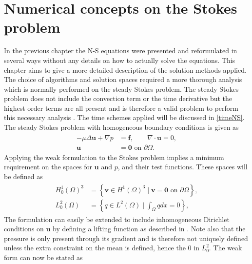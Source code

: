 


\section{Numerical concepts on the Stokes problem} \label{stokes}
In the previous chapter the N-S equations were presented and reformulated in several ways without any details on how to
actually solve the equations. This chapter aims to give a more detailed description of the solution methods applied.
The choice of algorithms and solution spaces required a more thorough analysis which is normally performed on the 
steady Stokes problem. The steady Stokes problem does not include the convection term or the time derivative 
but the highest order terms are all present and is therefore a valid problem to perform this necessary
analysis \cite{Karniadakis}. The time schemes applied will be discussed in \cref{timeNS}.
The steady Stokes problem with homogeneous boundary conditions is given as 
%
\begin{align}
    \begin{split}
        - \mu \Delta \mathbf{u} + \nabla p &= \mathbf{f}, \qquad \nabla \cdot \mathbf{u} = 0, \\
        \mathbf{u} &= \mathbf{0} \text{  on  } \partial \Omega.
    \end{split}
    \label{eq:stokes}
\end{align}
%
Applying the weak formulation to the Stokes problem implies a minimum requirement on the spaces for $\mathbf{u}$ and $p$,
and their test functions. These spaces will be defined as 
%
\begin{align}
    \begin{split}
        H_0^1(\Omega)^{3} &= \left\{ \mathbf{v} \in H^1(\Omega)^{3}\; |
        \; \mathbf{v} = \mathbf{0} \text{  on  } \partial \Omega \right\},\\
    L_0^2(\Omega) &= \left\{ q \in L^2(\Omega)\; |\; \int_{\Omega} q dx = 0 \right\},
    \end{split}
    \label{eq:spaces}
\end{align}
%
The formulation can easily be extended to include inhomogeneous Dirichlet conditions on $\mathbf{u}$ by defining a 
lifting function as described in \cite{Quarteroni}. Note also that the pressure is only present through its gradient 
and is therefore not uniquely defined unless the extra constraint on the mean is defined, hence the $0$ in $L_0^2$. 
The weak form can now be stated as

